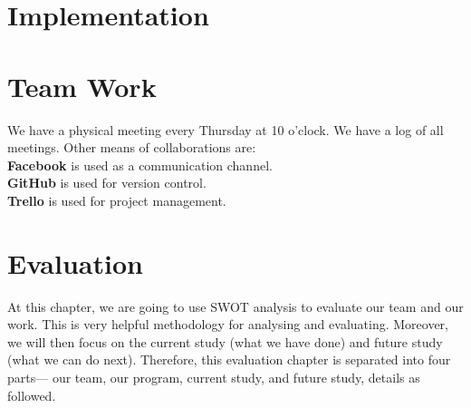\documentclass[11pt]{article}
\begin{document}
\newpage
\section{Implementation}

\newpage
\section{Team Work}
We have a physical meeting every Thursday at 10 o'clock. We have a log of all meetings. Other means of collaborations are:
\newline \\
\textbf{Facebook} is used as a communication channel. \\
\textbf{GitHub} is used for version control. \\
\textbf{Trello} is used for project management.

\newpage
\section{Evaluation}
	\indent\indent At this chapter, we are going to use SWOT analysis to evaluate our team and our work. This is very helpful methodology for analysing and evaluating. Moreover, we will then focus on the current study (what we have done) and future study (what we can do next). Therefore, this evaluation chapter is separated into four parts— our team, our program, current study, and future study, details as followed.
\end{document}
